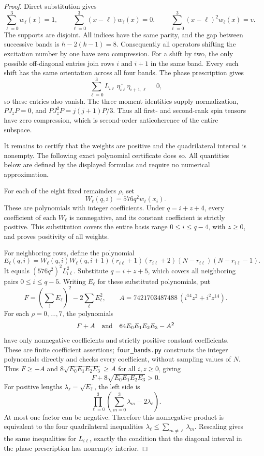 \documentclass[11pt]{article}
\begin{document}
\begin{proof}
Direct substitution gives
\[
 \sum_{\ell=0}^3w_\ell(x)=1,\qquad
 \sum_{\ell=0}^3(x-\ell)w_\ell(x)=0,\qquad
 \sum_{\ell=0}^3(x-\ell)^2w_\ell(x)=v.
\]
The supports are disjoint.  All indices have the same parity, and the gap
between successive bands is $h-2(k-1)=8$.  Consequently all operators
shifting the excitation number by one have zero compression.  For a shift
by two, the only possible off-diagonal entries join rows $i$ and $i+1$
in the same band.  Every such shift has the same orientation across all
four bands.  The phase prescription gives
\[
 \sum_{\ell=0}^3L_{i\ell}\,
 \overline{\eta_{i\ell}}\eta_{i+1,\ell}=0,
\]
so these entries also vanish.  The three moment identities supply
normalization, $PJ_zP=0$, and $PJ_z^2P=j(j+1)P/3$.
Thus all first- and second-rank spin tensors have zero compression,
which is second-order anticoherence of the entire subspace.

It remains to certify that the weights are positive and the quadrilateral
interval is nonempty.  The following exact polynomial certificate does so.
All quantities below are defined by the displayed formulas and require no
numerical approximation.

For each of the eight fixed remainders $\rho$, set
\[
 W_\ell(q,i)=576q^2 w_\ell(x_i).
\]
These are polynomials with integer coefficients.  Under $q=i+z+4$, every
coefficient of each $W_\ell$ is nonnegative, and its constant coefficient
is strictly positive.  This substitution covers the entire basis range
$0\le i\le q-4$, with $z\ge0$, and proves positivity of all weights.

For neighboring rows, define the polynomial
\[
 E_\ell(q,i)=W_\ell(q,i)W_\ell(q,i+1)
 (r_{i\ell}+1)(r_{i\ell}+2)(N-r_{i\ell})(N-r_{i\ell}-1).
\]
It equals $(576q^2)^2L_{i\ell}^2$.
Substitute $q=i+z+5$, which covers all neighboring pairs $0\le i\le q-5$.
Writing $E_\ell$ for these substituted polynomials, put
\[
 F=\left(\sum_\ell E_\ell\right)^2-2\sum_\ell E_\ell^2,
 \qquad A=7421703487488\,(i^{14}z^2+i^2z^{14}).
\]
For each $\rho=0,\ldots,7$, the polynomials
\[
 F+A\quad\hbox{and}\quad64E_0E_1E_2E_3-A^2
\]
have only nonnegative coefficients and strictly positive constant coefficients.  These are finite coefficient assertions;
\texttt{four\_bands.py} constructs the integer polynomials directly and
checks every coefficient, without sampling values of $N$.
Thus $F\ge-A$ and $8\sqrt{E_0E_1E_2E_3}\ge A$ for all $i,z\ge0$, giving
\[
 F+8\sqrt{E_0E_1E_2E_3}>0.
\]
For positive lengths $\lambda_\ell=\sqrt{E_\ell}$, the left side is
\[
 \prod_{\ell=0}^3\left(\sum_{m=0}^3\lambda_m-2\lambda_\ell\right).
\]
At most one factor can be negative.  Therefore this nonnegative product
is equivalent to the four quadrilateral inequalities
$\lambda_\ell\le\sum_{m\ne\ell}\lambda_m$.  Rescaling gives the same
inequalities for $L_{i\ell}$, exactly the condition that the diagonal
interval in the phase prescription has nonempty interior.
\end{proof}
\end{document}
